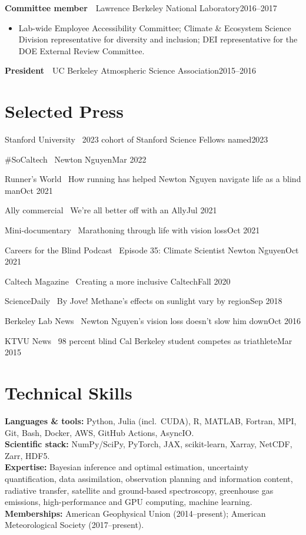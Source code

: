 \documentclass[11pt,letterpaper]{article}
\newcommand{\entry}[3]{\noindent\textbf{#1}~\textbar~#2\hfill{#3}\par}
\newcommand{\simpleentry}[2]{\noindent #1\hfill{#2}\par\vspace{1pt}}
\let\oldsection\section
\renewcommand{\section}[1]{\Needspace*{5\baselineskip}\oldsection{#1}}
\begin{document}
\entry{Committee member}{Lawrence Berkeley National Laboratory}{2016--2017}
\begin{itemize}
  \item Lab-wide Employee Accessibility Committee; Climate \& Ecosystem Science Division representative for diversity and inclusion; DEI representative for the DOE External Review Committee.
\end{itemize}
\vspace{3pt}

\simpleentry{\textbf{President}~\textbar~UC Berkeley Atmospheric Science Association}{2015--2016}

\section{Selected Press}

\simpleentry{Stanford University \textbar\ 2023 cohort of Stanford Science Fellows named}{2023}
\simpleentry{\#SoCaltech \textbar\ Newton Nguyen}{Mar 2022}
\simpleentry{Runner's World \textbar\ How running has helped Newton Nguyen navigate life as a blind man}{Oct 2021}
\simpleentry{Ally commercial \textbar\ We're all better off with an Ally}{Jul 2021}
\simpleentry{Mini-documentary \textbar\ Marathoning through life with vision loss}{Oct 2021}
\simpleentry{Careers for the Blind Podcast \textbar\ Episode 35: Climate Scientist Newton Nguyen}{Oct 2021}
\simpleentry{Caltech Magazine \textbar\ Creating a more inclusive Caltech}{Fall 2020}
\simpleentry{ScienceDaily \textbar\ By Jove! Methane's effects on sunlight vary by region}{Sep 2018}
\simpleentry{Berkeley Lab News \textbar\ Newton Nguyen's vision loss doesn't slow him down}{Oct 2016}
\simpleentry{KTVU News \textbar\ 98 percent blind Cal Berkeley student competes as triathlete}{Mar 2015}

\section{Technical Skills}

\textbf{Languages \& tools:} Python, Julia (incl.\ CUDA), R, MATLAB, Fortran, MPI, Git, Bash, Docker, AWS,
GitHub Actions, AsyncIO.\\[2pt]
\textbf{Scientific stack:} NumPy/SciPy, PyTorch, JAX, scikit-learn, Xarray, NetCDF, Zarr, HDF5.\\[2pt]
\textbf{Expertise:} Bayesian inference and optimal estimation, uncertainty quantification, data assimilation,
observation planning and information content, radiative transfer, satellite and ground-based spectroscopy,
greenhouse gas emissions, high-performance and GPU computing, machine learning.\\[2pt]
\textbf{Memberships:} American Geophysical Union (2014--present); American Meteorological Society
(2017--present).
\end{document}
